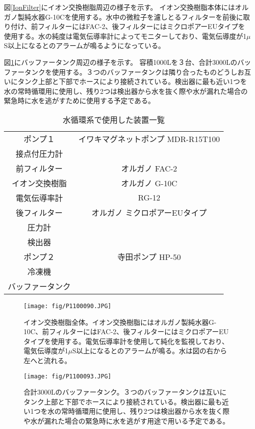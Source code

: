 \documentclass[11pt]{jreport}
\newcommand{\figref}[1]{図\ref{#1}}
\begin{document}
\figref{IonFilter}にイオン交換樹脂周辺の様子を示す。
イオン交換樹脂本体にはオルガノ製純水器G-10Cを使用する。水中の微粒子を濾しとるフィルターを前後に取り付け、前フィルターにはFAC-2、後フィルターにはミクロポアーEUタイプを使用する。水の純度は電気伝導率計によってモニターしており、電気伝導度が1$\mu$S以上になるとのアラームが鳴るようになっている。

\figref{BufferTank}にバッファータンク周辺の様子を示す。
容積1000Lを３台、合計3000Lのバッファータンクを使用する。３つのバッファータンクは隣り合ったものどうしお互いにタンク上部と下部でホースにより接続されている。検出器に最も近い1つを水の常時循環用に使用し、残り2つは検出器から水を抜く際や水が漏れた場合の緊急時に水を逃がすために使用する予定である。

\begin{table}[htdp]
\caption[水循環系で使用した装置一覧]{水循環系で使用した装置一覧}
\begin{center}
\begin{tabular}{cc}
\hline \hline
ポンプ１ & イワキマグネットポンプ MDR-R15T100\\
接点付圧力計 & \\
前フィルター & オルガノ FAC-2\\
イオン交換樹脂 & オルガノ G-10C\\
電気伝導率計 & RG-12\\
後フィルター & オルガノ ミクロポアーEUタイプ\\
圧力計 & \\
検出器 & \\
ポンプ２ & 寺田ポンプ HP-50\\
冷凍機 & \\
バッファータンク & \\
\hline \hline
\end{tabular}
\end{center}
\label{WaterEquip}
\end{table}%
\fi


\begin{figure}[htbp]
\begin{minipage}{0.47\textwidth}
\centering
\texttt{[image: fig/P1100090.JPG]}
\caption[イオン交換樹脂]{イオン交換樹脂全体。イオン交換樹脂にはオルガノ製純水器G-10C、前フィルターにはFAC-2、後フィルターにはミクロポアーEUタイプを使用する。電気伝導率計を使用して純化を監視しており、電気伝導度が1$\mu$S以上になるとのアラームが鳴る。水は図の右から左へと流れる。}
\label{IonFilter}
\end{minipage}
\hfil
\begin{minipage}{0.47\textwidth}
\centering
\texttt{[image: fig/P1100093.JPG]}
\caption[バッファータンク]{合計3000Lのバッファータンク。３つのバッファータンクは互いにタンク上部と下部でホースにより接続されている。検出器に最も近い1つを水の常時循環用に使用し、残り2つは検出器から水を抜く際や水が漏れた場合の緊急時に水を逃がす用途で用いる予定である。}
\label{BufferTank}
\end{minipage}
\end{figure}
\end{document}
